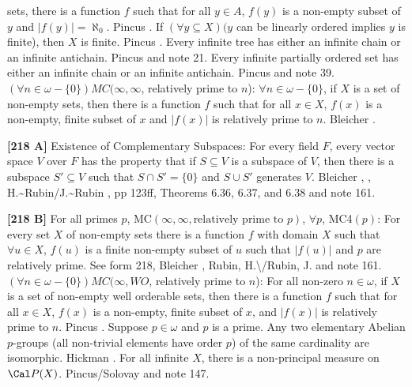 sets, there is a function $f$ such that for all $y\in A$, $f(y)$
is a non-empty subset of $y$ and $|f(y)|=\aleph_{0}$. \ac{Pincus}
\cite{1977a}.
\medskip
{} If $(\forall y\subseteq X)(y$ can be linearly
ordered implies $y$ is finite), then $X$ is finite. \ac{Pincus}
\cite{1972a}.
\medskip
{} Every infinite tree has either an infinite
chain or an infinite antichain.  \ac{Pincus} \cite{1972a} and note 21.
\medskip
{} Every infinite partially ordered set has either
an infinite chain or an infinite antichain. \ac{Pincus} \cite{1972a}
and note 39.
\medskip
{} $(\forall n\in\omega - \{0\}) MC(\infty,\infty
$, relatively prime to $n$): $\forall n\in\omega -\{0\}$, if $X$ is a
set of non-empty sets, then  there  is  a function $f$ such that
for all $x\in X$, $f(x)$ is a non-empty, finite subset of $x$
and $|f(x)|$ is relatively prime to $n$.  \ac{Bleicher} \cite{1965}.
\smallskip
\item{}{\bf [218 A]} Existence of Complementary Subspaces:  For every
field $F$, every vector space $V$ over $F$ has the property that if
$S\subseteq V$ is a subspace of $V$, then there is a subspace $S'\subseteq
V$ such that $S\cap S'= \{0\}$ and $S\cup S'$ generates $V$. \ac{Bleicher}
\cite{1964}, \cite{1965}, \ac{H.~Rubin/J.~Rubin} \cite{1985}, pp 123ff,
Theorems 6.36, 6.37, and 6.38 and note 161.
\smallskip
\item{}{\bf [218 B]} For all primes $p$, MC$(\infty,\infty,\text{
relatively prime to $p$})$, $\forall p$, MC4$(p)$:  For every set $X$ of
non-empty sets there is a function $f$ with domain $X$ such that $\forall
u \in X$, $f(u)$ is a finite non-empty subset of $u$ such that  $|f(u)|$
and $p$ are relatively prime. See form 218, \ac{Bleicher} \cite{1964},
\ac{Rubin, H.\/Rubin, J.} \cite{1985, p.124} and note 161.
\medskip
{}  $(\forall n\in\omega-\{0\}) MC(\infty,WO$,
relatively prime to $n$): For all non-zero $n\in \omega$, if $X$ is a set
of non-empty well orderable sets, then there is a function $f$ such that
for all $x\in X$, $f(x)$ is a non-empty, finite subset of $x$,
and $|f(x)|$ is relatively prime to $n$.  \ac{Pincus} \cite{1972a}.
\medskip
{} Suppose $p\in\omega$ and $p$ is a prime.
Any two elementary Abelian $p$-groups (all non-trivial elements have
order $p$) of the same cardinality are isomorphic. \ac{Hickman}
\cite{1977b}.
\medskip
{} For all infinite $X$, there is a non-principal
measure on $\Cal P(X)$.  \ac{Pincus/Solovay} \cite{1977} and note 147.
